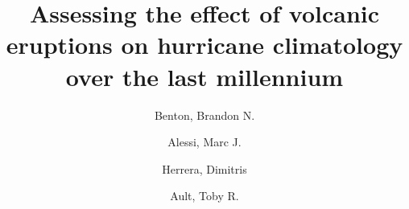 %
\RequirePackage{fix-cm}
%
%
\documentclass[a4paper]{article}
%
\usepackage{graphicx}
\usepackage{booktabs}
\usepackage{afterpage}
\setcounter{tocdepth}{4}
\setcounter{secnumdepth}{4}
\newcommand{\myparagraph}[1]{\paragraph{#1}\mbox{}\\\mbox{}\\}

%


\title{Assessing the effect of volcanic eruptions on hurricane climatology over the last millennium}


\author{Benton, Brandon N. \and Alessi, Marc J. \and Herrera, Dimitris \and Ault, Toby R.}


\maketitle


